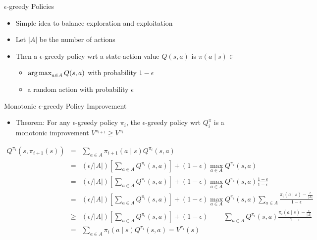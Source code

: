 \documentclass[aspectratio=169]{../latex_main/tntbeamer}  %
\begin{document}
\begin{frame}[c]{$\epsilon$-greedy Policies}
	
	\begin{itemize}
	\item Simple idea to balance exploration and exploitation
	\item Let $|A|$ be the number of actions
	\item Then a $\epsilon$-greedy policy wrt a state-action value $Q(s,a)$ is $\pi(a\mid s) \in $
	\begin{itemize}
		\item $\operatorname*{arg\,max}_{a\in A} Q(s,a)$ with probability $1 - \epsilon$
		\item a random action with probability $\epsilon$
	\end{itemize}
\end{itemize}
	
\end{frame}
\begin{frame}[c]{Monotonic $\epsilon$-greedy Policy Improvement}
	
	\begin{itemize}
		\item Theorem: For any $\epsilon$-greedy policy $\pi_i$, the $\epsilon$-greedy policy wrt $Q^{\pi}_i$ is a monotonic improvement $V^{\pi_{i+1}} \geq V^{\pi_i}$
	\end{itemize}

\footnotesize
\begin{eqnarray}
Q^{\pi_i} (s,\pi_{i+1} (s)) &=& \sum_{a \in A} \pi_{i+1}(a \mid s) Q^{\pi_{i}}(s,a)\nonumber\\
	&=& (\epsilon / |A|) \left[\sum_{a\in A} Q^{\pi_{i}}(s,a) \right] + (1- \epsilon) \max_{a\in A} Q^{\pi_{i}}(s,a)\nonumber\\
	&=& (\epsilon / |A|) \left[\sum_{a\in A} Q^{\pi_{i}}(s,a) \right] + (1- \epsilon) \max_{a\in A} Q^{\pi_{i}}(s,a)\frac{1-\epsilon}{1-\epsilon}\nonumber\\
	&=& (\epsilon / |A|) \left[\sum_{a\in A} Q^{\pi_{i}}(s,a) \right] + (1- \epsilon) \max_{a\in A} Q^{\pi_{i}}(s,a)\sum_{a\in A}\frac{\pi_i(a\mid s) - \frac{\epsilon}{|A|}}{1-\epsilon}\nonumber\\
	&\geq& (\epsilon / |A|) \left[\sum_{a\in A} Q^{\pi_{i}}(s,a) \right] + (1- \epsilon) \qquad~ \sum_{a\in A}Q^{\pi_{i}}(s,a)\frac{\pi_i(a\mid s) - \frac{\epsilon}{|A|}}{1-\epsilon} \nonumber\\
	&=& \sum_{a\in A} \pi_i (a \mid s) Q^{\pi_i}(s,a) = V^{\pi_i}(s)\nonumber
\end{eqnarray}
	
\end{frame}
\end{document}
